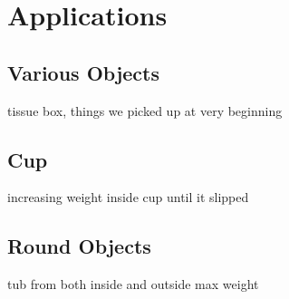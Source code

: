 \chapter{Applications}

\section{Various Objects}
tissue box, things we picked up at very beginning

\section{Cup}
increasing weight inside cup until it slipped

\section{Round Objects}
tub from both inside and outside max weight 